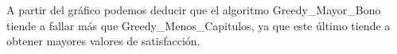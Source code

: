 A partir del gráfico podemos deducir que el algoritmo Greedy\_Mayor\_Bono tiende a fallar más que Greedy\_Menos\_Capitulos, ya que este último tiende a obtener mayores valores de satisfacción.



